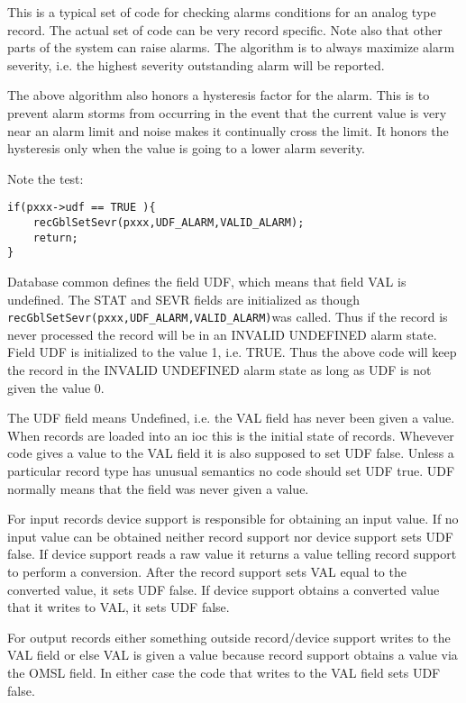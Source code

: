 This is a typical set of code for checking alarms conditions for an analog type record.
The actual set of code can be very record specific.
Note also that other parts of the system can raise alarms.
The algorithm is to always maximize alarm severity, i.e. the highest severity outstanding alarm will be reported.

The above algorithm also honors a hysteresis factor for the alarm.
This is to prevent alarm storms from occurring in the event that the current value is very near an alarm limit and noise makes it continually cross the limit.
It honors the hysteresis only when the value is going to a lower alarm severity.

Note the test:

\begin{verbatim}
if(pxxx->udf == TRUE ){
    recGblSetSevr(pxxx,UDF_ALARM,VALID_ALARM);
    return;
}
\end{verbatim}

Database common defines the field UDF, which means that field VAL is undefined.
The STAT and SEVR fields are initialized as though \verb|recGblSetSevr(pxxx,UDF_ALARM,VALID_ALARM)|was called.
Thus if the record is never processed the record will be in an INVALID UNDEFINED alarm state.
Field UDF is initialized to the value 1, i.e. TRUE.
Thus the above code will keep the record in the INVALID UNDEFINED alarm state as long as UDF is not given the value 0.

The UDF field means Undefined, i.e. the VAL field has never been given a value.
When records are loaded into an ioc this is the initial state of records.
Whevever code gives a value to the VAL field it is also supposed to set UDF false.
Unless a particular record type has unusual semantics no code should set UDF true.
UDF normally means that the field was never given a value.

For input records device support is responsible for obtaining an input value.
If no input value can be obtained neither record support nor device support sets UDF false.
If device support reads a raw value it returns a value telling record support to perform a conversion.
After the record support sets VAL equal to the converted value, it sets UDF false.
If device support obtains a converted value that it writes to VAL, it sets UDF false.

For output records either something outside record/device support writes to the VAL field or else VAL is given a value because record support obtains a value via the OMSL field.
In either case the code that writes to the VAL field sets UDF false.

